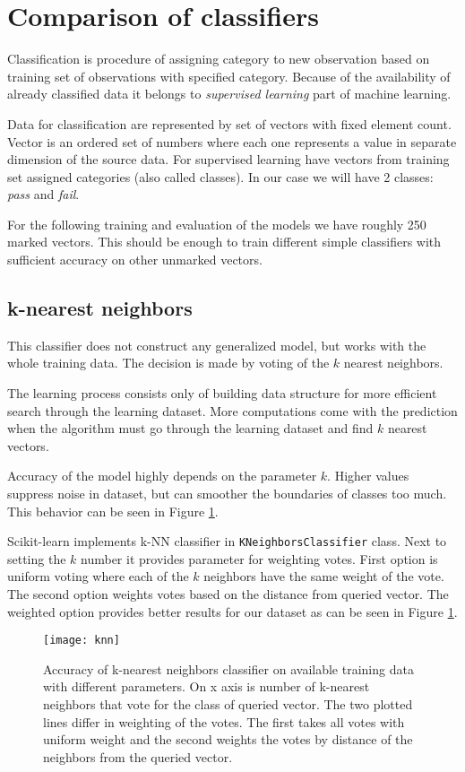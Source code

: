 \section{Comparison of classifiers}
Classification is procedure of assigning category to new observation based on
training set of observations with specified category. Because of the
availability of already classified data it belongs to \emph{supervised learning}
part of machine learning.

Data for classification are represented by set of vectors with fixed element
count. Vector is an ordered set of numbers where each one represents a value in
separate dimension of the source data. For supervised learning have vectors from
training set assigned categories (also called classes). In our case we will have
2 classes: \emph{pass} and \emph{fail}.

For the following training and evaluation of the models we have roughly 250
marked vectors. This should be enough to train different simple classifiers with
sufficient accuracy on other unmarked vectors.

\subsection{k-nearest neighbors}
This classifier does not construct any generalized model, but works with the
whole training data. The decision is made by voting of the $k$ nearest
neighbors.

The learning process consists only of building data structure for more efficient
search through the learning dataset. More computations come with the prediction
when the algorithm must go through the learning dataset and find $k$ nearest
vectors.

Accuracy of the model highly depends on the parameter $k$. Higher values
suppress noise in dataset, but can smoother the boundaries of classes too much.
This behavior can be seen in Figure \ref{fig:knn}.

Scikit-learn implements k-NN classifier in \texttt{KNeighborsClassifier} class.
Next to setting the $k$ number it provides parameter for weighting votes. First
option is uniform voting where each of the $k$ neighbors have the same weight of
the vote. The second option weights votes based on the distance from queried
vector. The weighted option provides better results for our dataset as can be
seen in Figure \ref{fig:knn}.

\begin{figure}
  \centering
  \texttt{[image: knn]}
  \caption{Accuracy of k-nearest neighbors classifier on available training
    data with different parameters. On x axis is number of k-nearest neighbors
    that vote for the class of queried vector. The two plotted lines differ in
    weighting of the votes. The first takes all votes with uniform weight and
    the second weights the votes by distance of the neighbors from the queried
    vector.}
  \label{fig:knn}
\end{figure}

